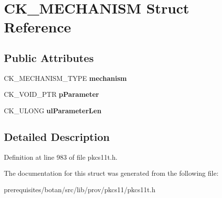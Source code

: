 \hypertarget{struct_c_k___m_e_c_h_a_n_i_s_m}{}\section{C\+K\+\_\+\+M\+E\+C\+H\+A\+N\+I\+SM Struct Reference}
\label{struct_c_k___m_e_c_h_a_n_i_s_m}
\subsection*{Public Attributes}
\begin{DoxyCompactItemize}
\item 
\mbox{\label{struct_c_k___m_e_c_h_a_n_i_s_m_a9184d5862b90646ed36cab61a9102d7a}} 
C\+K\+\_\+\+M\+E\+C\+H\+A\+N\+I\+S\+M\+\_\+\+T\+Y\+PE {\bfseries mechanism}
\item 
\mbox{\label{struct_c_k___m_e_c_h_a_n_i_s_m_a1653492fcd85698632f51f84596eb743}} 
C\+K\+\_\+\+V\+O\+I\+D\+\_\+\+P\+TR {\bfseries p\+Parameter}
\item 
\mbox{\label{struct_c_k___m_e_c_h_a_n_i_s_m_a47eeb17fc7cb3daac0e297c9af360798}} 
C\+K\+\_\+\+U\+L\+O\+NG {\bfseries ul\+Parameter\+Len}
\end{DoxyCompactItemize}


\subsection{Detailed Description}


Definition at line 983 of file pkcs11t.\+h.



The documentation for this struct was generated from the following file\+:\begin{DoxyCompactItemize}
\item 
prerequisites/botan/src/lib/prov/pkcs11/pkcs11t.\+h\end{DoxyCompactItemize}
